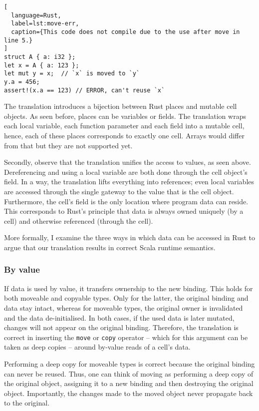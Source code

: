 \begin{lstlisting}[
  language=Rust,
  label=lst:move-err,
  caption={This code does not compile due to the use after move in line 5.}
]
struct A { a: i32 };
let x = A { a: 123 };
let mut y = x;  // `x` is moved to `y`
y.a = 456;
assert!(x.a == 123) // ERROR, can't reuse `x`
\end{lstlisting}

The translation introduces a bijection between Rust places and mutable cell
objects. As seen before, places can be variables or fields. The translation
wraps each local variable, each function parameter and each field into a mutable
cell, hence, each of these places corresponds to exactly one cell. Arrays would
differ from that but they are not supported yet.

Secondly, observe that the translation unifies the access to values, as seen
above. Dereferencing and using a local variable are both done through the cell
object's field. In a way, the translation lifts everything into references; even
local variables are accessed through the single gateway to the value that is the
cell object. Furthermore, the cell's field is the only location where program
data can reside. This corresponds to Rust's principle that data is always owned
uniquely (by a cell) and otherwise referenced (through the cell).

More formally, I examine the three ways in which data can be accessed in Rust to
argue that our translation results in correct Scala runtime semantics.

\subsubsection{By value}
\label{sec:correctness-by-value}

If data is used by value, it transfers ownership to the new binding. This holds
for both moveable and copyable types. Only for the latter, the original binding
and data stay intact, whereas for moveable types, the original owner is
invalidated and the data de-initialised. In both cases, if the used data is
later mutated, changes will not appear on the original binding. Therefore, the
translation is correct in inserting the \lstinline!move! or \lstinline!copy!
operator -- which for this argument can be taken as deep copies -- around
by-value reads of a cell's data.

Performing a deep copy for moveable types is correct because the original
binding can never be reused. Thus, one can think of moving as performing a deep
copy of the original object, assigning it to a new binding and then destroying
the original object. Importantly, the changes made to the moved object never
propagate back to the original.

